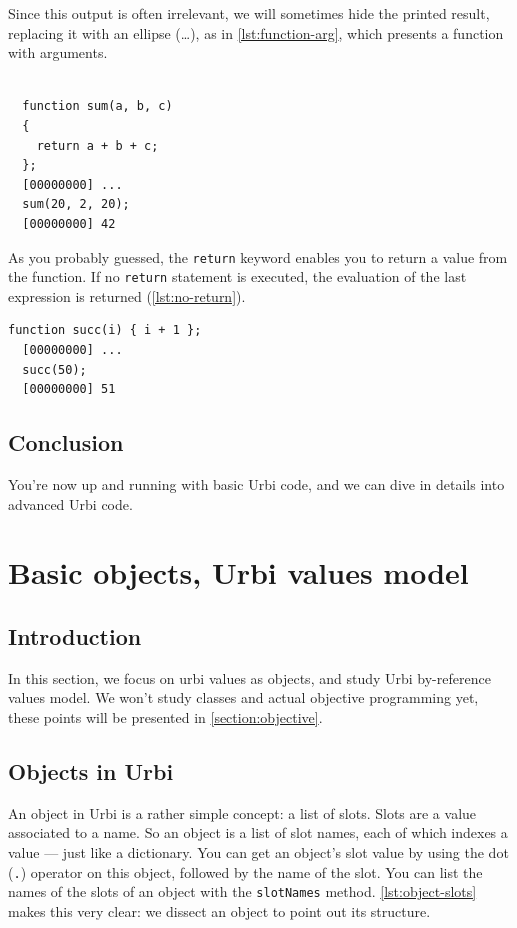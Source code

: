 \documentclass[openright,twoside,12pt]{report}
\newcommand{\urbi}{Urbi\xspace}
\newcommand{\lst}[1]{\autoref{lst:#1}}
\begin{document}
Since this output is often irrelevant, we will sometimes hide the
printed result, replacing it with an ellipse (\ldots), as in
\lst{function-arg}, which presents a function with arguments.

\begin{lstlisting}[caption=Function with
  arguments,label=lst:function-arg]

  function sum(a, b, c)
  {
    return a + b + c;
  };
  [00000000] ...
  sum(20, 2, 20);
  [00000000] 42
\end{lstlisting}

As you probably guessed, the \texttt{return} keyword enables you to
return a value from the function. If no \texttt{return} statement is
executed, the evaluation of the last expression is returned
(\lst{no-return}).

  \begin{lstlisting}[caption=Return value is the last evaluated value,
    label=lst:no-return]
  function succ(i) { i + 1 };
  [00000000] ...
  succ(50);
  [00000000] 51
\end{lstlisting}

\section{Conclusion}

You're now up and running with basic \urbi code, and we can dive in
details into advanced \urbi code.

\chapter{Basic objects, \urbi values model} %

\section{Introduction}

In this section, we focus on urbi values as objects, and study \urbi
by-reference values model. We won't study classes and actual objective
programming yet, these points will be presented in
\autoref{section:objective}.

\section{Objects in \urbi}

An object in \urbi is a rather simple concept: a list of slots. Slots
are a value associated to a name. So an object is a list of slot
names, each of which indexes a value --- just like a dictionary. You
can get an object's slot value by using the dot (\texttt{.}) operator
on this object, followed by the name of the slot. You can list the
names of the slots of an object with the \texttt{slotNames}
method. \lst{object-slots} makes this very clear: we dissect an object
to point out its structure.
\end{document}
